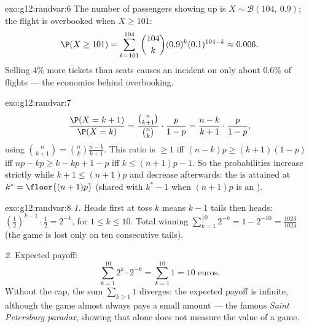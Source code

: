 \begin{solution}{exo:g12:randvar:6}
The number of passengers showing up is $X \sim \mathcal B(104,\ 0.9)$; the
flight is overbooked when $X \geq 101$:
\[
\P(X \geq 101) = \sum_{k=101}^{104}\binom{104}{k}(0.9)^k(0.1)^{104-k}
\approx 0.006 .
\]
Selling $4\%$ more tickets than seats causes an incident on only about
$0.6\%$ of flights --- the economics behind overbooking.
\end{solution}

\begin{solution}{exo:g12:randvar:7}
\[
\frac{\P(X = k+1)}{\P(X = k)}
= \frac{\binom{n}{k+1}}{\binom nk}\cdot\frac{p}{1-p}
= \frac{n - k}{k + 1}\cdot\frac{p}{1-p},
\]
using $\binom{n}{k+1} = \binom nk \frac{n-k}{k+1}$. This ratio is $\geq 1$
iff $(n-k)p \geq (k+1)(1-p)$ iff $np - k p \geq k - kp + 1 - p$ iff
$k \leq (n+1)p - 1$. So the probabilities increase strictly while
$k + 1 \leq (n+1)p$ and decrease afterwards: the  is attained at
$k^* = \floor{(n+1)p}$ (shared with $k^* - 1$ when $(n+1)p$ is an
).
\end{solution}

\begin{solution}{exo:g12:randvar:8}
\emph{1.} Heads first at toss $k$ means $k-1$ tails then heads:
 $\left(\frac12\right)^{k-1}\cdot\frac12 = 2^{-k}$, for
$1 \leq k \leq 10$. Total winning 
$\sum_{k=1}^{10} 2^{-k} = 1 - 2^{-10} = \frac{1023}{1024}$ (the game is
lost only on ten consecutive tails).

\emph{2.} Expected payoff:
\[
\sum_{k=1}^{10} 2^k \cdot 2^{-k} = \sum_{k=1}^{10} 1 = 10 \text{ euros}.
\]
Without the cap, the sum $\sum_{k\geq1} 1$ diverges: the expected payoff is
infinite, although the game almost always pays a small amount --- the
famous \emph{Saint Petersburg paradox}, showing that  alone does
not measure the value of a game.
\end{solution}

